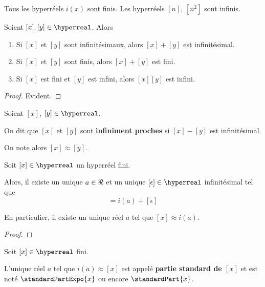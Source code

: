 \documentclass[a4paper, 12pt]{report}
\begin{document}
\begin{exemple}
	Tous les hyperréels $i(x)$ sont finis. Les hyperréels $[n]$, $[n^{2}]$ sont
	infinis.
\end{exemple}

\begin{proposition}
	Soient $[x], [y] \in \hyperreal$. Alors

	\begin{enumerate}
		\item Si $[x]$ et $[y]$ sont infinitésimaux, alors $[x] + [y]$ est
			infinitésimal.
		\item Si $[x]$ et $[y]$ sont finis, alors $[x] + [y]$ est fini.
		\item Si $[x]$ est fini et $[y]$ est infini, alors $[x] [y]$ est infini.
	\end{enumerate}
\end{proposition}

\ifdefined\outputproof
\begin{proof}
	Evident.
\end{proof}
\fi

\begin{definition} 
	Soient $[x]$, $[y] \in \hyperreal$.

	On dit que $[x]$ et $[y]$ sont \textbf{infiniment proches} si $[x] - [y]$ est
	infinitésimal.

	On note alors $[x] \approx [y]$.
\end{definition}

\begin{proposition}
	Soit $[x] \in \hyperreal$ un hyperréel fini.

	Alors, il existe un unique $a \in \real$ et un unique $[\epsilon] \in \hyperreal$
	infinitésimal tel que
	\begin{equation}
		[x] = i(a) + [\epsilon]
	\end{equation}

	En particulier, il existe un unique réel $a$ tel que $[x] \approx i(a)$.
\end{proposition}

\ifdefined\outputproof
\begin{proof}

\end{proof}
\fi

\begin{definition} 
	Soit $[x] \in \hyperreal$ fini.

	L'unique réel $a$ tel que $i(a) \approx [x]$
	est appelé \textbf{partie standard de $[x]$} et est noté
	$\standardPartExpo{x}$
	ou encore $\standardPart{x}$.
\end{definition}
\end{document}
